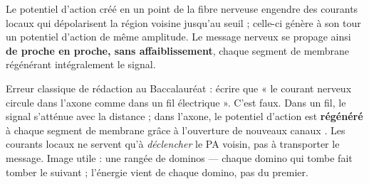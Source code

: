 \documentclass[11pt]{article}
\newcommand{\cle}[1]{{\popxbold\color{popdark}#1}}
\begin{document}
\begin{propriete}
Le potentiel d'action créé en un point de la fibre nerveuse engendre des \cle{courants locaux} qui dépolarisent la région voisine jusqu'au seuil ; celle-ci génère à son tour un potentiel d'action de même amplitude. Le message nerveux se propage ainsi \textbf{de proche en proche, sans affaiblissement}, chaque segment de membrane régénérant intégralement le signal.
\end{propriete}

\begin{attention}
Erreur classique de rédaction au Baccalauréat : écrire que « le courant nerveux circule dans l'axone comme dans un fil électrique ». C'est faux. Dans un fil, le signal s'atténue avec la distance ; dans l'axone, le potentiel d'action est \textbf{régénéré} à chaque segment de membrane grâce à l'ouverture de nouveaux canaux . Les courants locaux ne servent qu'à \emph{déclencher} le PA voisin, pas à transporter le message. Image utile : une rangée de dominos — chaque domino qui tombe fait tomber le suivant ; l'énergie vient de chaque domino, pas du premier.
\end{attention}
\end{document}
